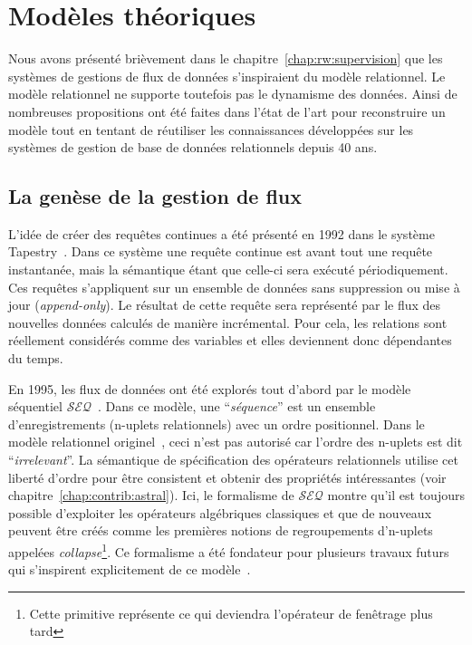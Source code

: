 \section{Modèles théoriques}
Nous avons présenté brièvement dans le chapitre~\ref{chap:rw:supervision} que les systèmes de gestions de flux de données s'inspiraient du modèle relationnel. Le modèle relationnel ne supporte toutefois pas le dynamisme des données. Ainsi de nombreuses propositions ont été faites dans l'état de l'art pour reconstruire un modèle tout en tentant de réutiliser les connaissances développées sur les systèmes de gestion de base de données relationnels depuis 40 ans.


\subsection{La genèse de la gestion de flux}
L'idée de créer des requêtes continues a été présenté en 1992 dans le système Tapestry~\cite{Terry:tapestry}. Dans ce système une requête continue est avant tout une requête instantanée, mais la sémantique étant que celle-ci sera exécuté périodiquement. Ces requêtes s'appliquent sur un ensemble de données sans suppression ou mise à jour (\textit{append-only}). Le résultat de cette requête sera représenté par le flux des nouvelles données calculés de manière incrémental. Pour cela, les relations sont réellement considérés comme des variables et elles deviennent donc dépendantes du temps.

En 1995, les flux de données ont été explorés tout d'abord par le modèle séquentiel $\mathcal{SEQ}$~\cite{Seshadri:seq}. Dans ce modèle, une \enquote{\it séquence} est un ensemble d'enregistrements (n-uplets relationnels) avec un ordre positionnel. Dans le modèle relationnel originel~\cite{Codd:model}, ceci n'est pas autorisé car l'ordre des n-uplets est dit \enquote{\it irrelevant}. La sémantique de spécification des opérateurs relationnels utilise cet liberté d'ordre pour être consistent et obtenir des propriétés intéressantes (voir chapitre~\ref{chap:contrib:astral}). Ici, le formalisme de $\mathcal{SEQ}$ montre qu'il est toujours possible d'exploiter les opérateurs algébriques classiques et que de nouveaux peuvent être créés comme les premières notions de regroupements d'n-uplets appelées \textit{collapse}\footnote{Cette primitive représente ce qui deviendra l'opérateur de fenêtrage plus tard}. Ce formalisme a été fondateur pour plusieurs travaux futurs qui s'inspirent explicitement de ce modèle~\cite{Gurgen:sens,Babcock:issues}.

